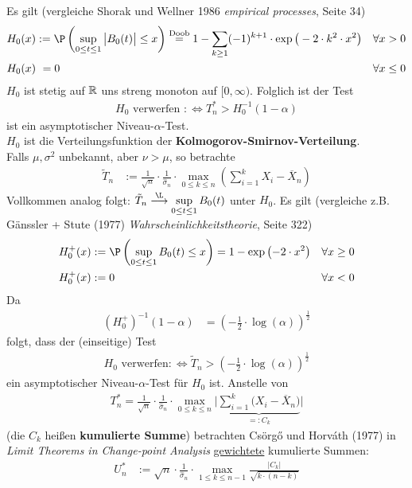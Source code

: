 Es gilt (vergleiche Shorak und Wellner 1986 \textit{empirical processes}, Seite 34)
\begin{align*}
	H_0(x)&:=\P\left(\sup\limits_{0\leq t\leq 1}\big|B_0(t)\big|\leq x\right)
	\overset{\text{Doob}}{=}
	1-\sum\limits_{k\geq 1}(-1)^{k+1}\cdot\exp\big(-2\cdot k^2\cdot x^2\big)&\forall x>0\\
	H_0(x)&~=0 &\forall x\leq 0
\end{align*}
$H_0$ ist stetig auf $\mathbb{R}$ uns streng monoton auf $[0,\infty)$. 
Folglich ist der Test
\begin{align*}
	H_0\text{ verwerfen }:\Longleftrightarrow T_n^\ast>H_0^{-1}(1-\alpha)
\end{align*}
ist ein asymptotischer Niveau-$\alpha$-Test.\\
$H_0$ ist die Verteilungsfunktion der \textbf{Kolmogorov-Smirnov-Verteilung}.\\
Falls $\mu,\sigma^2$ unbekannt, aber $\nu>\mu$, so betrachte 
\begin{align*}
	\tilde{T}_n&:=\frac{1}{\sqrt{n}}\cdot\frac{1}{\hat{\sigma}_n}\cdot\max\limits_{0\leq k\leq n}\left(\sum\limits_{i=1}^kX_i-\overline{X}_n\right)
\end{align*}
Vollkommen analog folgt: $\tilde{T}_n\stackrel{\L}{\longrightarrow}\sup\limits_{0\leq t\leq 1} B_0(t)$ unter $H_0$. 
Es gilt (vergleiche z.B. Gänssler + Stute (1977) \textit{Wahrscheinlichkeitstheorie}, Seite 322)
\begin{align*}
	H_0^+(x)&:=\P\left(\sup\limits_{0\leq t\leq 1}B_0(t)\leq x\right)=1-\exp\left(-2\cdot x^2\right) &\forall x\geq0\\
	H_0^+(x)&:=0 &\forall x<0
\end{align*}
Da 
\begin{align*}
	(H_0^+)^{-1}(1-\alpha)&=\left(-\frac{1}{2}\cdot\log(\alpha)\right)^{\frac{1}{2}}
\end{align*}
folgt, dass der (einseitige) Test
\begin{align*}
	H_0\text{ verwerfen}:\Longleftrightarrow\tilde{T}_n>\left(-\frac{1}{2}\cdot\log(\alpha)\right)^{\frac{1}{2}}
\end{align*}
ein asymptotischer Niveau-$\alpha$-Test für $H_0$ ist.\nl
Anstelle von
\begin{align*}
	T_n^\ast=\frac{1}{\sqrt{n}}\cdot\frac{1}{\hat{\sigma}_n}\cdot\max\limits_{0\leq k \leq n}\bigg|\underbrace{\sum\limits_{i=1}^k\big(X_i-\overline{X}_n\big)}_{=:C_k}\bigg|
\end{align*}
(die $C_k$ heißen \textbf{kumulierte Summe}) betrachten Csörgő und Horváth (1977) in \textit{Limit Theorems in Change-point Analysis} \ul{gewichtete} kumulierte Summen:
\begin{align*}
	U_n^\ast&:=\sqrt{n}\cdot\frac{1}{\hat{\sigma}_n}\cdot\max\limits_{1\leq k\leq n-1}\frac{|C_k|}{\sqrt{k\cdot(n-k)}}
\end{align*}

